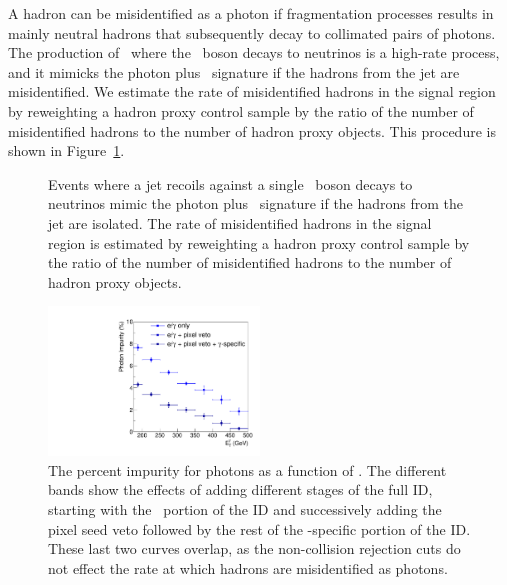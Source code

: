 A hadron can be misidentified as a photon if fragmentation processes results in mainly neutral hadrons that subsequently decay to collimated pairs of photons.
The production of \zj\ where the \PZ\ boson decays to neutrinos is a high-rate process, and it mimicks the photon plus \met\ signature if the hadrons from the jet are misidentified.
We estimate the rate of misidentified hadrons in the signal region by reweighting a hadron proxy control sample by the ratio of the number of misidentified hadrons to the number of hadron proxy objects.
This procedure is shown in Figure~\ref{fig:hfake_diagram}.

\begin{figure}[htbp]
  \centering
  \caption{
       Events where a jet recoils against a single \PZ\ boson decays to neutrinos mimic the photon plus \met\ signature if the hadrons from the jet are isolated. 
       The rate of misidentified hadrons in the signal region is estimated by reweighting a hadron proxy control sample by the ratio of the number of misidentified hadrons to the number of hadron proxy objects. 
    }
    \label{fig:hfake_diagram}
\end{figure}

\begin{figure}[htbp]
  \centering
  \includegraphics[width=0.5\textwidth]{Analysis/Figures/hfake/plot_impurity_barrel_medium.pdf}
  \caption{
    The percent impurity for photons as a function of \pt. 
    The different bands show the effects of adding different stages of the full ID, starting with the \egamma\ portion of the ID and successively adding the pixel seed veto followed by the rest of the \Pgg-specific portion of the ID.
    These last two curves overlap, as the non-collision rejection cuts do not effect the rate at which hadrons are misidentified as photons.
  }
  \label{fig:impurity-compsb}
\end{figure}

